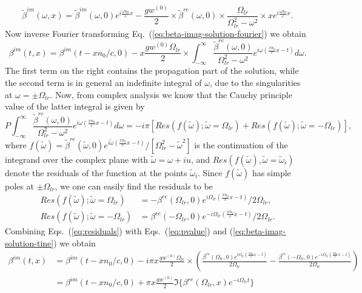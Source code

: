 \documentclass[onecolumn,secnumarabic,amssymb, nobibnotes, aip, prd]{revtex4-1}
\def\t{\tilde}
\def\om{\omega}
\begin{document}
\begin{equation}
\label{eq:beta-imag-solution-fourier}
\t\beta^{im}(\om,x) = \t\beta^{im}(\om,0)e^{i\frac{\om n_0}{c}x} -\frac{g w^{(0)} }{2}\times  \t\beta^{re}(\om,0) \times\frac{\Omega_{lr}}{\Omega_{lr}^2-\om^2}\times x e^{i\frac{\om n_0}{c}x}.
\end{equation}
Now inverse Fourier transforming Eq.~(\ref{eq:beta-imag-solution-fourier}) we obtain
\begin{equation}
\label{eq:beta-imag-solution-tine}
\beta^{im}(t,x) = \beta^{im}(t-xn_0/c,0)  -x\frac{g w^{(0)} \Omega_{lr} }{2}\times \int_{-\infty}^{\infty} \frac{\t\beta^{re}(\om,0)}{\Omega_{lr}^2-\om^2} e^{i\om(\frac{x n_0}{c}x-t)}d\omega.
\end{equation}
The first term on the right contains the propagation part of the solution, while the second term is in general an indefinite integral of $\omega$, due to the singularities at $\omega = \pm \Omega_{lr}$. Now, from complex analysis we know that the Cauchy principle value of the latter integral is given by
\begin{equation}
\label{eq:pvalue}
P \int_{-\infty}^{\infty} \frac{\t\beta^{re}(\om,0)}{\Omega_{lr}^2-\om^2} e^{i\om(\frac{x n_0}{c}x-t)}d\omega = -i\pi \left[Res(f(\tilde\omega);\tilde\omega=\Omega_{lr})+Res(f(\tilde\omega);\tilde\omega=-\Omega_{lr})\right],
\end{equation}
where $f(\tilde\omega) = \t\beta^{re}(\tilde\omega,0) e^{i\tilde\omega(\frac{x n_0}{c}x-t)}/[\Omega_{lr}^2-\tilde\omega^2]$ is the continuation of the integrand over the complex plane with $\tilde\omega = \omega + iu$, and $Res(f(\tilde{\omega}),\tilde\omega=\tilde\omega_i)$ denote the residuals of the function at the points $\tilde\omega_i$. Since $f(\tilde\omega)$ has simple poles at $\pm\Omega_{lr}$, we one can easily find the residuals to be 
\begin{subequations}
\label{eq:residuals}
\begin{align}
Res(f(\tilde{\omega});\tilde{\omega}=\Omega_{lr}) &= - \beta^{re}(\Omega_{lr},0)e^{i\Omega_{lr}(\frac{x n_0}{c}x-t)}/2\Omega_{lr}, \\
Res(f(\tilde{\omega});\tilde{\omega}=-\Omega_{lr}) &= \beta^{re}(-\Omega_{lr},0)e^{-i\Omega_{lr}(\frac{x n_0}{c}x-t)}/2\Omega_{lr}.
\end{align}
\end{subequations}
Combining Eqs.~(\ref{eq:residuals}) with Eqs.~(\ref{eq:pvalue}) and (\ref{eq:beta-imag-solution-tine}) we obtain
\begin{subequations}
	\begin{align}
	\beta^{im}(t,x) &= \beta^{im}(t-xn_0/c,0)  -i\pi x\frac{g w^{(0)} \Omega_{lr} }{2}\times \left( \frac{\beta^{re}(\Omega_{lr},0)e^{i\Omega_{lr}(\frac{x n_0}{c}x-t)}}{2\Omega_{lr}}-\frac{\beta^{re}(-\Omega_{lr},0)e^{-i\Omega_{lr}(\frac{x n_0}{c}x-t)}}{2\Omega_{lr}} \right) \nonumber \\
	&= \beta^{im}(t-xn_0/c,0)+\pi x\frac{g w^{(0)}}{2}\Im\{ \beta^{re}(\Omega_{lr},x)e^{-i\Omega_{lr}t}\} 
	\end{align}
\end{subequations}
\end{document}
